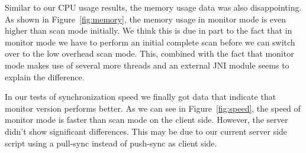 
Similar to our CPU usage results, the memory usage data was also disappointing. As shown in Figure~\ref{fig:memory}, the memory usage in monitor mode is even higher than scan mode initially. We think this is due in part to the fact that in monitor mode we have to perform an initial complete scan before we can switch over to the low overhead scan mode.  This, combined with the fact that monitor mode makes use of several more threads and an external JNI module seems to explain the difference.


In our tests of synchronization speed we finally got data that indicate that monitor version performs better. 
As we can see in Figure~\ref{fig:speed}, the speed of monitor mode is faster than scan mode on the client side. However,
the server didn't show significant differences. This may be due to our current server side script using a pull-sync instead of push-sync as client side.






